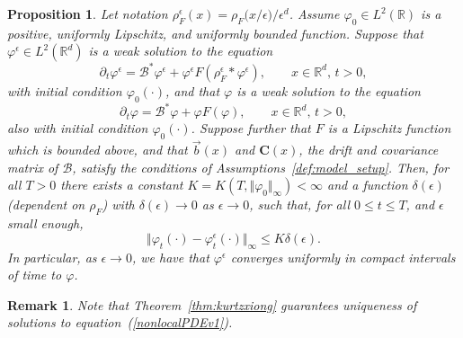 \documentclass[12pt]{article}
\newtheorem{proposition}[theorem]{Proposition}
\newtheorem{remark}[theorem]{Remark}
\newcommand{\IR}{\mathbb R}
\newcommand{\DG}{\mathcal{B}}  %
\newcommand{\meanq}{\vec b}    %
\newcommand{\covq}{\mathbf{C}}     %
\numberwithin{equation}{section}
\begin{document}
\begin{proposition}
    \label{prop:nonlocal_to_local}
Let notation $\rho^\epsilon_F(x)=\rho_F\big(x/\epsilon)/\epsilon^d$.
Assume $\varphi_0\in L^2(\IR)$ is a positive, uniformly Lipschitz, and uniformly bounded function. 
Suppose that $\varphi^\epsilon\in L^2(\IR^d)$ is a weak solution to the equation
\begin{equation}
\label{nonlocalPDEv1} 
\partial_t \varphi^\epsilon = \DG^* \varphi^\epsilon + 
\varphi^\epsilon F(\rho_F^\epsilon*\varphi^\epsilon),  
\qquad x \in \mathbb{R}^d,\, t >0, %
\end{equation}
with initial condition $\varphi_0(\cdot)$,
and that $\varphi$ is a weak solution to the equation
 \begin{equation}
\label{localPDE} 
\partial_t \varphi = \DG^* \varphi + \varphi F(\varphi),  
\qquad x \in \mathbb{R}^d,\, t >0, %
\end{equation}
also with initial condition $\varphi_0(\cdot)$.
Suppose further that $F$ is a Lipschitz function which is bounded above, and that
$\meanq(x)$ and $\covq(x)$, the drift and 
covariance matrix of $\DG$, satisfy the conditions of 
Assumptions~\ref{def:model_setup}.
Then, for all $T>0$ there exists a constant $K=K(T, \Vert \varphi_0 \Vert_\infty) < \infty$
and a function $\delta(\epsilon)$ (dependent on $\rho_F$) with $\delta(\epsilon)\to 0$ 
as $\epsilon\to 0$,
such that, for all $0 \leq t \leq T$, and $\epsilon$ small enough,
\[ 
\Vert \varphi_t(\cdot) - \varphi_t^\epsilon(\cdot) \Vert_\infty\leq K\delta(\epsilon). 
\]
In particular, as $\epsilon\to 0$, we have that $\varphi^\epsilon$ converges 
uniformly in compact intervals of time to $\varphi$.
\end{proposition}

\begin{remark}
Note that Theorem~\ref{thm:kurtzxiong} guarantees uniqueness of solutions
to equation~(\ref{nonlocalPDEv1}). 
\end{remark}
\end{document}
